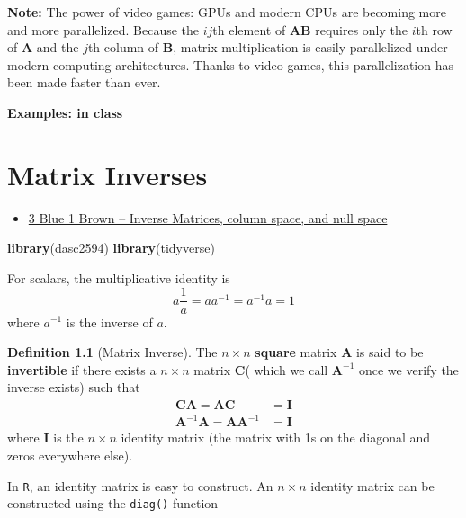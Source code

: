 \documentclass[
]{book}
\newenvironment{Shaded}{\begin{snugshade}}{\end{snugshade}}
\newcommand{\KeywordTok}[1]{\textcolor[rgb]{0.13,0.29,0.53}{\textbf{#1}}}
\newcommand{\NormalTok}[1]{#1}
\providecommand{\tightlist}{%
  \setlength{\itemsep}{0pt}\setlength{\parskip}{0pt}}
\theoremstyle{definition}
\newtheorem{definition}{Definition}[chapter]
\theoremstyle{definition}
\theoremstyle{definition}
\theoremstyle{remark}
\begin{document}
\textbf{Note:} The power of video games: GPUs and modern CPUs are becoming more and more parallelized. Because the \(ij\)th element of \(\mathbf{A}\mathbf{B}\) requires only the \(i\)th row of \(\mathbf{A}\) and the \(j\)th column of \(\mathbf{B}\), matrix multiplication is easily parallelized under modern computing architectures. Thanks to video games, this parallelization has been made faster than ever.

\textbf{Examples: in class}

\hypertarget{matrix-inverse}{%
\chapter{Matrix Inverses}\label{matrix-inverse}}

\begin{itemize}
\tightlist
\item
  \href{https://www.3blue1brown.com/lessons/inverse-matrices}{3 Blue 1 Brown -- Inverse Matrices, column space, and null space}
\end{itemize}

\begin{Shaded}
\begin{Highlighting}[]
\KeywordTok{library}\NormalTok{(dasc2594)}
\KeywordTok{library}\NormalTok{(tidyverse)}
\end{Highlighting}
\end{Shaded}

For scalars, the multiplicative identity is
\[
a \frac{1}{a} = a a^{-1} = a^{-1} a = 1
\]
where \(a^{-1}\) is the inverse of \(a\).

\begin{definition}[Matrix Inverse]
\protect\hypertarget{def:matrix-inverse}{}{\label{def:matrix-inverse} {} }
The \(n \times n\) \textbf{square} matrix \(\mathbf{A}\) is said to be \textbf{invertible} if there exists a \(n \times n\) matrix \(\mathbf{C}\)( which we call \(\mathbf{A}^{-1}\) once we verify the inverse exists) such that
\[
\begin{aligned}
\mathbf{C}\mathbf{A} = \mathbf{A} \mathbf{C} & = \mathbf{I} \\
\mathbf{A}^{-1} \mathbf{A} = \mathbf{A} \mathbf{A}^{-1} & = \mathbf{I}
\end{aligned}
\]
where \(\mathbf{I}\) is the \(n \times n\) identity matrix (the matrix with 1s on the diagonal and zeros everywhere else).
\end{definition}

In \texttt{R}, an identity matrix is easy to construct. An \(n \times n\) identity matrix can be constructed using the \texttt{diag()} function
\end{document}
